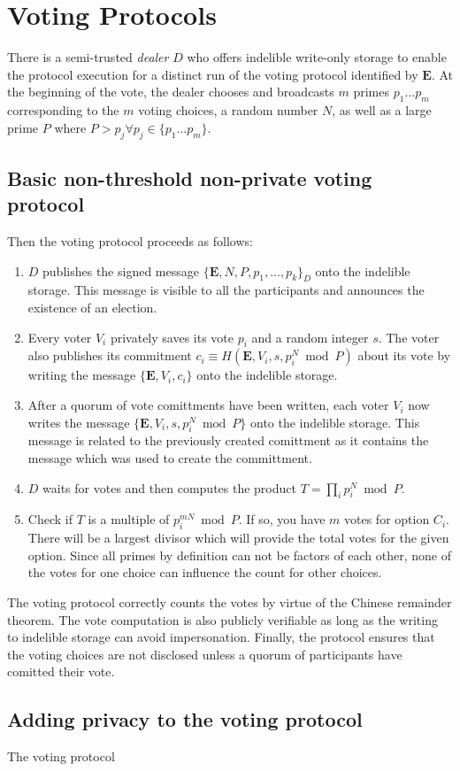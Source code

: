 
\section{Voting Protocols}
There is a semi-trusted \emph{dealer} $D$ who offers indelible write-only storage to enable the protocol
execution for a distinct run of the voting protocol identified by $\mathbf{E}$.
At the beginning of the vote, the dealer chooses and broadcasts $m$ primes $p_1\ldots p_m$
corresponding to the $m$ voting choices, a random number $N$, as well as
a large prime $P$ where ${\displaystyle P > p_j \forall p_j \in \{p_1\ldots p_m\}}$.

\subsection{Basic non-threshold non-private voting protocol}
Then the voting protocol proceeds as follows:
\begin{enumerate}
\item{
$D$ publishes the signed message $\{\mathbf{E},N, P, p_1, \ldots, p_k\}_D$ onto
the indelible storage.
This message is visible to all the participants and announces the existence of an election.
}
\item{
Every voter $V_i$ privately saves its vote $p_{i}$ and a random integer $s$.
The voter also publishes its commitment $c_i \equiv  H(\mathbf{E},V_i,s,p_{i}^N \bmod P)$
about its vote by writing the message
$\{ \mathbf{E} , V_i , c_i \}$ onto the indelible storage.
}
\item{
After a quorum of vote comittments have been written, each voter $V_i$ now
writes the message
$\{ \mathbf{E},V_i,s,p_{i}^N \bmod P \}$ 
onto the indelible storage. This message is related to the previously created comittment as it
contains the message which was used to create the committment.
}
\item{
$D$ waits for votes and then computes the product ${\displaystyle T = \prod_i p_{i}^N \bmod P }$.
}
\item{
Check if $T$ is a multiple of $p_i^{mN} \bmod P$.  If so, you have $m$ votes for option $C_i$.  There will be a
largest divisor which will provide the total votes for the given option.  Since all primes by definition can
not be factors of each other, none of the votes for one choice can influence the count for other choices.
}
\end{enumerate}

The voting protocol correctly counts the votes by virtue of the Chinese remainder theorem.  The vote computation
is also publicly verifiable as long as the writing to indelible storage can avoid impersonation.  Finally,
the protocol ensures that the voting choices are not disclosed unless a quorum of participants have comitted their vote.
\subsection{Adding privacy to the voting protocol}
The voting protocol 
